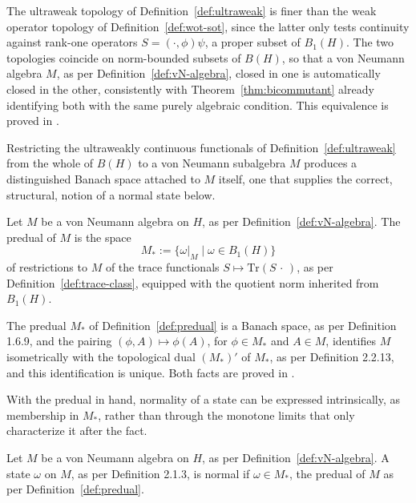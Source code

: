 \begin{remark}
	The ultraweak topology of Definition~\ref{def:ultraweak} is finer than
	the weak operator topology of Definition~\ref{def:wot-sot}, since the
	latter only tests continuity against rank-one operators $S =
	(\cdot,\phi)\psi$, a proper subset of $B_1(H)$. The two topologies
	coincide on norm-bounded subsets of $B(H)$, so that a von Neumann
	algebra $M$, as per Definition~\ref{def:vN-algebra}, closed in one is
	automatically closed in the other, consistently with
	Theorem~\ref{thm:bicommutant} already identifying both with the same
	purely algebraic condition. This equivalence is proved in \cite[TODO:
	collocazione precisa]{TODO-traceclass}.
\end{remark}

Restricting the ultraweakly continuous functionals of
Definition~\ref{def:ultraweak} from the whole of $B(H)$ to a von
Neumann subalgebra $M$ produces a distinguished Banach space attached
to $M$ itself, one that supplies the correct, structural, notion of a
normal state below.

\begin{definition}[Predual]\label{def:predual}
	Let $M$ be a von Neumann algebra on $H$, as per
	Definition~\ref{def:vN-algebra}. The predual of $M$ is the space
	\[
	M_* := \big\{ \omega|_M \mid \omega \in B_1(H) \big\}
	\]
	of restrictions to $M$ of the trace functionals $S \mapsto
	\mathrm{Tr}(S \, \cdot \,)$, as per Definition~\ref{def:trace-class},
	equipped with the quotient norm inherited from $B_1(H)$.
\end{definition}

\begin{remark}
	The predual $M_*$ of Definition~\ref{def:predual} is a Banach space, as
	per Definition 1.6.9, and the pairing $(\phi, A) \mapsto \phi(A)$, for
	$\phi \in M_*$ and $A \in M$, identifies $M$ isometrically with the
	topological dual $(M_*)'$ of $M_*$, as per Definition 2.2.13, and this
	identification is unique. Both facts are proved in \cite[TODO:
	collocazione precisa]{TODO-predual}.
\end{remark}

With the predual in hand, normality of a state can be expressed
intrinsically, as membership in $M_*$, rather than through the monotone
limits that only characterize it after the fact.

\begin{definition}\label{def:normal-state}
	Let $M$ be a von Neumann algebra on $H$, as per
	Definition~\ref{def:vN-algebra}. A state $\omega$ on $M$, as per
	Definition 2.1.3, is normal if $\omega \in M_*$, the predual of $M$ as
	per Definition~\ref{def:predual}.
\end{definition}

